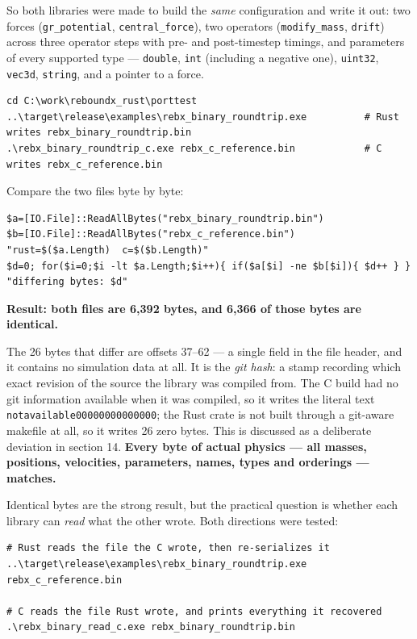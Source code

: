 \documentclass[11pt]{article}
\begin{document}
So both libraries were made to build the \emph{same} configuration and write it out: two forces (\texttt{gr\_potential}, \texttt{central\_force}), two operators (\texttt{modify\_mass}, \texttt{drift}) across three operator steps with pre- and post-timestep timings, and parameters of every supported type --- \texttt{double}, \texttt{int} (including a negative one), \texttt{uint32}, \texttt{vec3d}, \texttt{string}, and a pointer to a force.

\begin{lstlisting}
cd C:\work\reboundx_rust\porttest
..\target\release\examples\rebx_binary_roundtrip.exe          # Rust writes rebx_binary_roundtrip.bin
.\rebx_binary_roundtrip_c.exe rebx_c_reference.bin            # C writes rebx_c_reference.bin
\end{lstlisting}

Compare the two files byte by byte:

\begin{lstlisting}
$a=[IO.File]::ReadAllBytes("rebx_binary_roundtrip.bin")
$b=[IO.File]::ReadAllBytes("rebx_c_reference.bin")
"rust=$($a.Length)  c=$($b.Length)"
$d=0; for($i=0;$i -lt $a.Length;$i++){ if($a[$i] -ne $b[$i]){ $d++ } }
"differing bytes: $d"
\end{lstlisting}

\textbf{Result: both files are 6,392 bytes, and 6,366 of those bytes are identical.}

The 26 bytes that differ are offsets 37--62 --- a single field in the file header, and it contains no simulation data at all. It is the \emph{git hash}: a stamp recording which exact revision of the source the library was compiled from. The C build had no git information available when it was compiled, so it writes the literal text \texttt{notavailable00000000000000}; the Rust crate is not built through a git-aware makefile at all, so it writes 26 zero bytes. This is discussed as a deliberate deviation in section 14. \textbf{Every byte of actual physics --- all masses, positions, velocities, parameters, names, types and orderings --- matches.}

Identical bytes are the strong result, but the practical question is whether each library can \emph{read} what the other wrote. Both directions were tested:

\begin{lstlisting}
# Rust reads the file the C wrote, then re-serializes it
..\target\release\examples\rebx_binary_roundtrip.exe rebx_c_reference.bin

# C reads the file Rust wrote, and prints everything it recovered
.\rebx_binary_read_c.exe rebx_binary_roundtrip.bin
\end{lstlisting}
\end{document}
